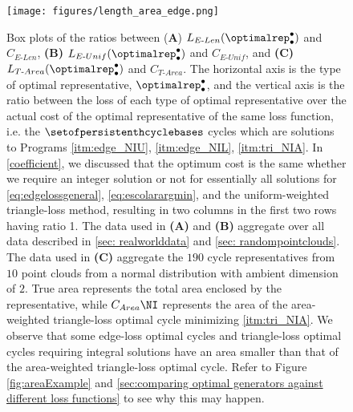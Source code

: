 \begin{figure}[h!]
\begin{center}
\texttt{[image: figures/length\_area\_edge.png]}
\end{center}
\caption{Box plots of the ratios between (\textbf{A}) $L_{E\text{-}Len}(\optimalrep_\bullet^\bullet)$ and $C_{E\text{-}Len}$,  \textbf{(B)} $L_{E\text{-}Unif}(\optimalrep_\bullet^\bullet)$ and $C_{E\text{-}Unif}$, and  \textbf{(C)} $L_{T\text{-}Area}(\optimalrep_\bullet^\bullet)$ and $C_{T\text{-}Area}$. 
The horizontal axis is the type of optimal representative, $\optimalrep_\bullet^\bullet$, and the vertical axis is the ratio between the loss of each type of optimal representative over the actual cost of the optimal representative of the same loss function, i.e. the $\setofpersistenthcyclebases$ cycles which are solutions to Programs \ref{itm:edge_NIU}, \ref{itm:edge_NIL}, \ref{itm:tri_NIA}.
In \se \ref{coefficient}, we discussed that the optimum cost is the same whether we require an integer solution or not for essentially all solutions for \pr \eqref{eq:edgelossgeneral}, \pr \ref{eq:escolarargmin}, and the uniform-weighted triangle-loss method, resulting in two columns in the first two rows having ratio 1. The data used in \textbf{(A)} and \textbf{(B)} aggregate over all data described in \ref{sec: realworlddata} and \ref{sec: randompointclouds}. The data used in \textbf{(C)} aggregate the $190$ cycle representatives from $10$ point clouds from a normal distribution with ambient dimension of $2$. True area represents the total area enclosed by the representative, while $C_{Area}\NI$ represents the area of the area-weighted triangle-loss optimal cycle minimizing \ref{itm:tri_NIA}. We observe that some edge-loss optimal cycles and triangle-loss optimal cycles requiring integral solutions have an area smaller than that of the area-weighted triangle-loss optimal cycle. Refer to Figure \ref{fig:areaExample} and \se  \ref{sec:comparing optimal generators against different loss functions} to see why this may happen. 
}
 \label{fig:lengthcocmpare}
\end{figure}

